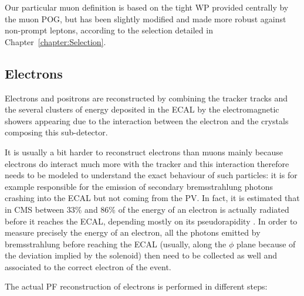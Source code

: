 \documentclass[a4paper, 10pt, openright]{report}
\begin{document}
Our particular muon definition is based on the tight \ac{WP} provided centrally by the muon \ac{POG}, but has been slightly modified and made more robust against non-prompt leptons, according to the selection detailed in Chapter~\ref{chapter:Selection}.

\subsection{Electrons} \label{subsection:Electrons}

Electrons and positrons are reconstructed by combining the tracker tracks and the several clusters of energy deposited in the \ac{ECAL} by the electromagnetic showers appearing due to the interaction between the electron and the crystals composing this sub-detector. 

It is usually a bit harder to reconstruct electrons than muons mainly because electrons do interact much more with the tracker and this interaction therefore needs to be modeled to understand the exact behaviour of such particles: it is for example responsible for the emission of secondary bremsstrahlung photons crashing into the \ac{ECAL} but not coming from the \ac{PV}. In fact, it is estimated that in \ac{CMS} between 33\% and 86\% of the energy of an electron is actually radiated before it reaches the \ac{ECAL}, depending mostly on its pseudorapidity \cite{EleReco}. In order to measure precisely the energy of an electron, all the photons emitted by bremsstrahlung before reaching the \ac{ECAL} (usually, along the $\phi$ plane because of the deviation implied by the solenoid) then need to be collected as well and associated to the correct electron of the event.

The actual \ac{PF} reconstruction of electrons is performed in different steps:
\end{document}
